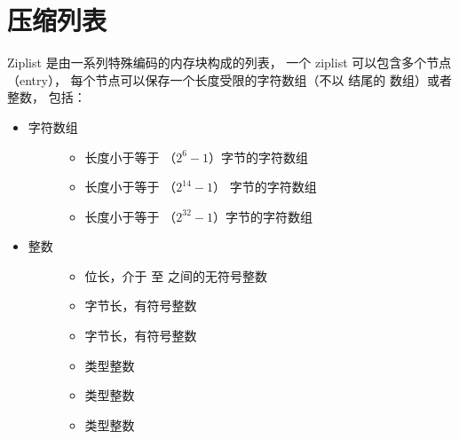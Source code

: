 \documentclass[a4paper,11pt,english]{sphinxmanual}
\begin{document}
\section{压缩列表}
\label{compress-datastruct/ziplist:ziplist-chapter}\label{compress-datastruct/ziplist::doc}\label{compress-datastruct/ziplist:id1}
Ziplist 是由一系列特殊编码的内存块构成的列表，
一个 ziplist 可以包含多个节点（entry），
每个节点可以保存一个长度受限的字符数组（不以  结尾的  数组）或者整数，
包括：
\begin{itemize}
\item {} \begin{description}
\item[{字符数组}] \leavevmode\begin{itemize}
\item {} 
长度小于等于  （$2^{6}-1$）字节的字符数组

\item {} 
长度小于等于  （$2^{14}-1$） 字节的字符数组

\item {} 
长度小于等于  （$2^{32}-1$）字节的字符数组

\end{itemize}

\end{description}

\item {} \begin{description}
\item[{整数}] \leavevmode\begin{itemize}
\item {} 
 位长，介于  至  之间的无符号整数

\item {} 
 字节长，有符号整数

\item {} 
 字节长，有符号整数

\item {} 
 类型整数

\item {} 
 类型整数

\item {} 
 类型整数

\end{itemize}

\end{description}

\end{itemize}
\end{document}
